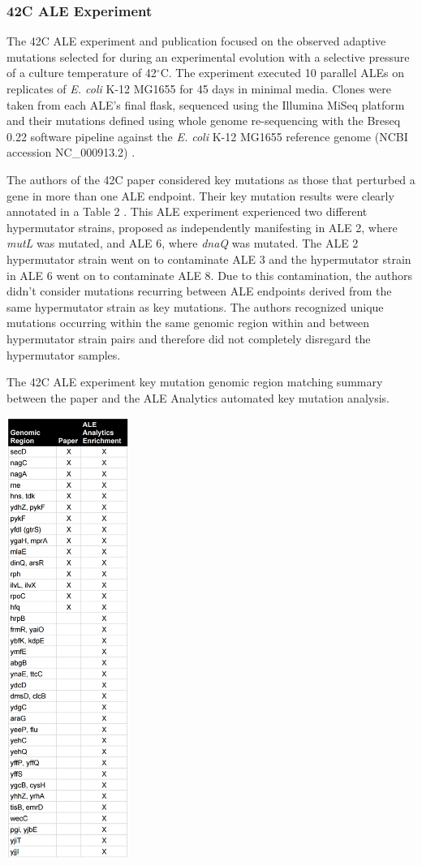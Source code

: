 \documentclass[12pt,final,masters,chapterheads]{ucsd}  %
\begin{document}
\subsubsection{42C ALE Experiment}
The 42C ALE experiment and publication focused on the observed adaptive mutations selected for during an experimental evolution with a selective pressure of a culture temperature of 42$^{\circ}$C. The experiment executed 10 parallel ALEs on replicates of \textit{E. coli} K-12 MG1655 for 45 days in minimal media. Clones were taken from each ALE's final flask, sequenced using the Illumina MiSeq platform and their mutations defined using whole genome re-sequencing with the Breseq 0.22 software pipeline against the \textit{E. coli} K-12 MG1655 reference genome (NCBI accession NC\_000913.2) \cite{pmid25015645}.

The authors of the 42C paper considered key mutations as those that perturbed a gene in more than one ALE endpoint. Their key mutation results were clearly annotated in a Table 2 \cite{pmid25015645}. This ALE experiment experienced two different hypermutator strains, proposed as independently manifesting in ALE 2, where \textit{mutL} was mutated, and ALE 6, where \textit{dnaQ} was mutated. The ALE 2 hypermutator strain went on to contaminate ALE 3 and the hypermutator strain in ALE 6 went on to contaminate ALE 8. Due to this contamination, the authors didn't consider mutations recurring between ALE endpoints derived from the same hypermutator strain as key mutations. The authors recognized unique mutations occurring within the same genomic region within and between hypermutator strain pairs and therefore did not completely disregard the hypermutator samples.
\begin{table}[H]
  \centering
  \caption{The 42C ALE experiment {key mutation} genomic region matching summary between the paper and the ALE Analytics automated key mutation analysis.}
  \includegraphics[width=0.3\textwidth]{42c_key_mutation_regions.png}
\end{table}
\end{document}
